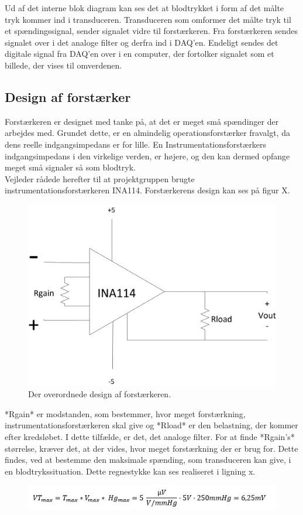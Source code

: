 Ud af det interne blok diagram kan ses det at blodtrykket i form af det målte tryk kommer ind i transduceren. Transduceren som omformer det målte tryk til et spændingssignal, sender signalet vidre til forstærkeren. Fra forstærkeren sendes signalet over i det analoge filter og derfra ind i DAQ'en. Endeligt sendes det digitale signal fra DAQ'en over i en computer, der fortolker signalet som et billede, der vises til omverdenen.

\subsection{Design af forstærker}
Forstærkeren er designet med tanke på, at det er meget små spændinger der arbejdes med. Grundet dette, er en almindelig operationsforstærker fravalgt, da dens reelle indgangsimpedans er for lille. En Instrumentationsforstærkers indgangsimpedans i den virkelige verden, er højere, og den kan dermed opfange meget små signaler så som blodtryk.\\
Vejleder rådede herefter til at projektgruppen brugte instrumentationsforstærkeren INA114. Forstærkerens design kan ses på figur X.\\ 
\begin{figure}[H]
	\centering
	\includegraphics[width=1\textwidth]{Figurer/Forstaerker}
	\caption{Der overordnede design af forstærkeren.}\label{labelpic}
\end{figure}
*Rgain* er modstanden, som bestemmer, hvor meget forstærkning, instrumentationsforstærkeren skal give og *Rload* er den belastning, der kommer efter kredsløbet. I dette tilfælde, er det, det analoge filter. For at finde *Rgain’s* størrelse, kræver det, at der vides, hvor meget forstærkning der er brug for. Dette findes, ved at bestemme den maksimale spænding, som transduceren kan give, i en blodtrykssituation. Dette regnestykke kan ses realiseret i ligning x.\\
\begin{figure}[H]
	\centering
	\includegraphics[width=1\textwidth]{Figurer/LigningSara}
\end{figure}

